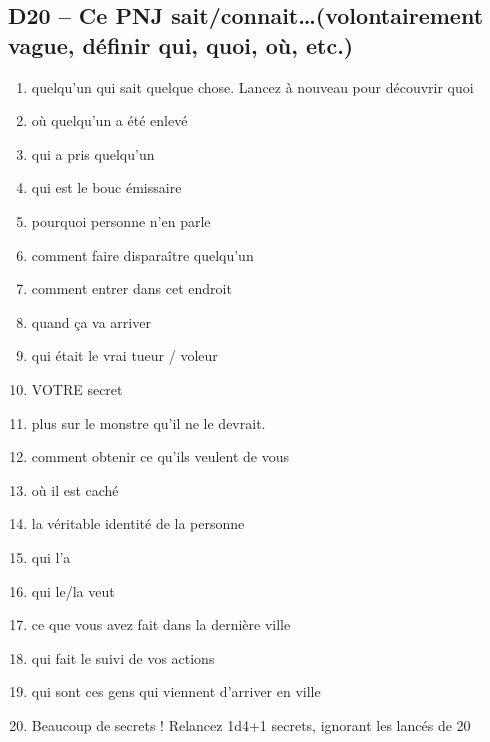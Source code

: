 \documentclass{article}
\begin{document}
\begin{multicols}{2}
	\section*{D20 -- Ce PNJ sait/connait\ldots (volontairement vague, définir qui, quoi, où, etc.)}
	\begin{enumerate}
		\item quelqu'un qui sait quelque chose. Lancez à nouveau pour découvrir quoi
		\item où quelqu'un a été enlevé
		\item qui a pris quelqu'un
		\item qui est le bouc émissaire
		\item pourquoi personne n'en parle
		\item comment faire disparaître quelqu'un
		\item comment entrer dans cet endroit
		\item quand ça va arriver
		\item qui était le vrai tueur / voleur
		\item VOTRE secret
		\item plus sur le monstre qu'il ne le devrait.
		\item comment obtenir ce qu'ils veulent de vous
		\item où il est caché
		\item la véritable identité de la personne
		\item qui l'a
		\item qui le/la veut
		\item ce que vous avez fait dans la dernière ville
		\item qui fait le suivi de vos actions
		\item qui sont ces gens qui viennent d'arriver en ville
		\item Beaucoup de secrets ! Relancez 1d4+1 secrets, ignorant les lancés de 20
	\end{enumerate}
\end{multicols}
\end{document}
